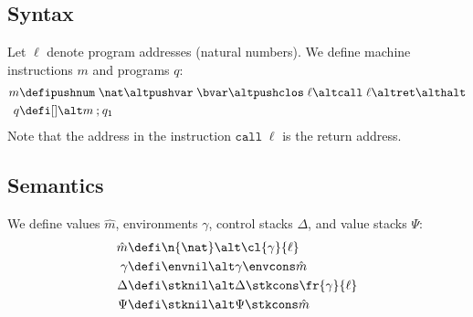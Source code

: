 \documentclass[12pt]{article}
\newcommand{\ensurecommand}[1]{\providecommand{#1}{}\renewcommand{#1}}
\begin{document}
\subsection*{Syntax}

\ensurecommand{\addr}{\ell}
\ensurecommand{\addrret}{\addr_{\mathrm{ret}}}

\ensurecommand{\minst}{m}
\ensurecommand{\mprog}{q}

\ensurecommand{\mpushnum}[1]{\mathtt{pushnum} \; #1}
\ensurecommand{\mpushvar}[1]{\mathtt{pushvar} \; #1}
\ensurecommand{\mpushclos}[1]{\mathtt{pushclos} \; #1}
\ensurecommand{\mcall}[1]{\mathtt{call} \; #1}
\ensurecommand{\mret}{\mathtt{ret}}
\ensurecommand{\mhalt}{\mathtt{halt}}

\ensurecommand{\mend}{\mathtt{[]}}
\ensurecommand{\mseq}{\mathbin{;}}

Let $\addr$ denote program addresses (natural numbers).
We define machine instructions $\minst$ and programs $\mprog$:
\begin{align*}
  \minst &\defi \mpushnum{\nat} \alt \mpushvar{\bvar} \alt \mpushclos{\addr} \alt \mcall{\addr} \alt \mret \alt \mhalt \\
  \mprog &\defi \mend \alt \minst \mseq \mprog_1
\end{align*}
Note that the address in the instruction $\mcall{\addr}$ is the return address.


\subsection*{Semantics}

\ensurecommand{\mval}{\hat{m}}
\ensurecommand{\menv}{\gamma}
\ensurecommand{\mctrl}{\Delta}
\ensurecommand{\mvals}{\Psi}

\ensurecommand{\mexec}[7]{\ensuremath{#1 : \tup{#2 \tupsep #3 \tupsep #4} \rightarrow \tup{#5 \tupsep #6 \tupsep #7}}}
\ensurecommand{\msteps}[7]{\ensuremath{#1 \vdash \tup{#2 \tupsep #3 \tupsep #4} \rightarrow^* \tup{#5 \tupsep #6 \tupsep #7}}}
\ensurecommand{\mlook}[3]{\ensuremath{#1 \vdash #2 \uparrow #3}}%

We define values $\mval$, environments $\menv$, control stacks $\mctrl$, and value stacks $\mvals$:
\begin{align*}
  \mval &\defi \n{\nat} \alt \cl{\menv}{\addr} \\
  \menv &\defi \envnil \alt \menv \envcons \mval \\
  \mctrl &\defi \stknil \alt \mctrl \stkcons \fr{\menv}{\addr} \\
  \mvals &\defi \stknil \alt \mvals \stkcons \mval
\end{align*}
\end{document}
